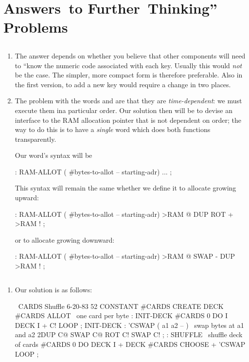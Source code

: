 
\chapter{Answers~to
Further~Thinking''
Problems}
\section{}
\begin{enumerate}
\item The answer depends on whether you believe that other components will
need to ``know the numeric code associated with each key.  Usually this
would \emph{not} be the case.  The simpler, more compact form is therefore
preferable.  Also in the first version, to add a new key would require a 
change in two places.
\item The problem with the words  and  are that they are 
\emph{time-dependent}:  we must execute them ina particular order.  Our solution
then will be to devise an interface to the RAM allocation pointer that is not
dependent on order; the way to do this is to have a \emph{single} word which does
both functions transparently.

Our word's syntax will be
\begin{Code}
: RAM-ALLOT   ( #bytes-to-allot -- starting-adr) 
    ... ;
\end{Code}
This syntax will remain the same whether we define it to allocate growing 
upward:
\begin{Code}
: RAM-ALLOT  ( #bytes-to-allot -- starting-adr)
    >RAM @  DUP ROT +  >RAM ! ;
\end{Code}
or to allocate growing downward:
\begin{Code}
: RAM-ALLOT  ( #bytes-to-allot -- starting-adr)
    >RAM @  SWAP -  DUP >RAM ! ;
\end{Code}
\end{enumerate}

\section{}
\ifeightyfour\begin{enumerate}
\item\fi Our solution is as follows:
\begin{Code}
\ CARDS               Shuffle                6-20-83
52 CONSTANT #CARDS
CREATE DECK  #CARDS ALLOT   \   one card per byte
: INIT-DECK
   #CARDS 0 DO  I  DECK I + C!  LOOP ;
INIT-DECK
: 'CSWAP  ( a1 a2 -- )  \  swap bytes at a1 and a2
   2DUP C@  SWAP C@  ROT C!  SWAP C! ;
: SHUFFLE   \  shuffle deck of cards
   #CARDS 0 DO  DECK I +  DECK  #CARDS CHOOSE +
      'CSWAP  LOOP ;
\end{Code}
\ifeightyfour\end{enumerate}\fi
